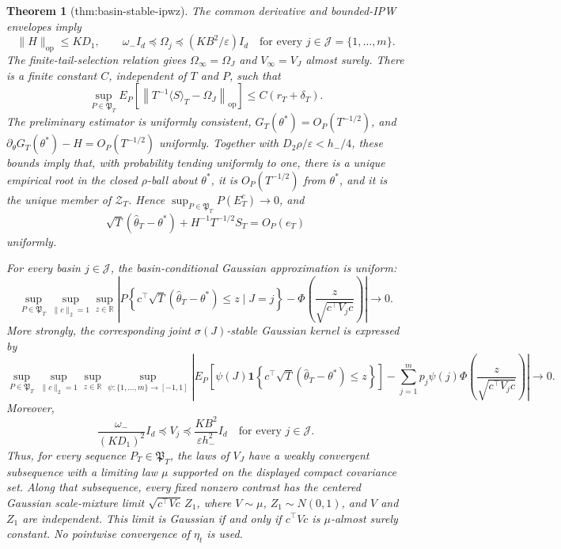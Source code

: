 \documentclass{article}
\newtheorem{theorem}{Theorem}
\begin{document}
\begin{theorem}[thm:basin-stable-ipwz]\label{thm:basin-stable-ipwz}
The common derivative and bounded-IPW envelopes imply
\[
 \|H\|_{\mathrm{op}}\le KD_1,
 \qquad
 \omega_-I_d\preceq\Omega_j\preceq(KB^2/\varepsilon)I_d
 \quad\text{for every }j\in\mathcal J=\{1,\ldots,m\}.
\]
The finite-tail-selection relation gives \(\Omega_\infty=\Omega_J\) and \(V_\infty=V_J\) almost surely. There is a finite constant \(C\), independent of \(T\) and \(P\), such that
\[
 \sup_{P\in\mathfrak P_T}E_P\!\left[
 \left\|T^{-1}\langle S\rangle_T-\Omega_J\right\|_{\mathrm{op}}\right]
 \le C(r_T+\delta_T).
\]
The preliminary estimator is uniformly consistent, \(G_T(\theta^*)=O_P(T^{-1/2})\), and \(\partial_\theta G_T(\theta^*)-H=O_P(T^{-1/2})\) uniformly. Together with \(D_2\rho/\varepsilon<h_-/4\), these bounds imply that, with probability tending uniformly to one, there is a unique empirical root in the closed \(\rho\)-ball about \(\theta^*\), it is \(O_P(T^{-1/2})\) from \(\theta^*\), and it is the unique member of \(\mathcal Z_T\). Hence \(\sup_{P\in\mathfrak P_T}P(E_T^c)\to0\), and
\[
 \sqrt T(\widehat\theta_T-\theta^*)+H^{-1}T^{-1/2}S_T=O_P(e_T)
\]
uniformly.

For every basin \(j\in\mathcal J\), the basin-conditional Gaussian approximation is uniform:
\[
 \sup_{P\in\mathfrak P_T}\sup_{\|c\|_2=1}\sup_{z\in\mathbb R}
 \left|P\!\left\{c^\top\sqrt T(\widehat\theta_T-\theta^*)\le z\mid J=j\right\}
 -\Phi\!\left(\frac{z}{\sqrt{c^\top V_jc}}\right)\right|
 \longrightarrow0.
\]
More strongly, the corresponding joint \(\sigma(J)\)-stable Gaussian kernel is expressed by
\[
 \sup_{P\in\mathfrak P_T}\sup_{\|c\|_2=1}\sup_{z\in\mathbb R}
 \sup_{\psi:\{1,\ldots,m\}\to[-1,1]}
 \left|E_P\!\left[\psi(J)\mathbf1\!\left\{
 c^\top\sqrt T(\widehat\theta_T-\theta^*)\le z\right\}\right]
 -\sum_{j=1}^mp_j\psi(j)\Phi\!\left(\frac{z}{\sqrt{c^\top V_jc}}\right)\right|
 \longrightarrow0.
\]
Moreover,
\[
 \frac{\omega_-}{(KD_1)^2}I_d\preceq V_j
 \preceq\frac{KB^2}{\varepsilon h_-^2}I_d
 \quad\text{for every }j\in\mathcal J.
\]
Thus, for every sequence \(P_T\in\mathfrak P_T\), the laws of \(V_J\) have a weakly convergent subsequence with a limiting law \(\mu\) supported on the displayed compact covariance set. Along that subsequence, every fixed nonzero contrast has the centered Gaussian scale-mixture limit \(\sqrt{c^\top Vc}\,Z_1\), where \(V\sim\mu\), \(Z_1\sim N(0,1)\), and \(V\) and \(Z_1\) are independent. This limit is Gaussian if and only if \(c^\top Vc\) is \(\mu\)-almost surely constant. No pointwise convergence of \(\eta_t\) is used.
\end{theorem}
\end{document}
